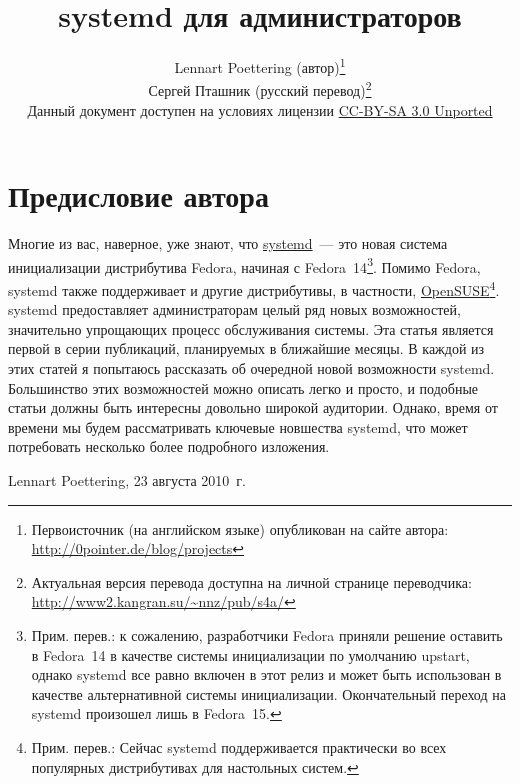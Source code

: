 \documentclass[10pt,oneside,a4paper]{article}
\newcommand{\sectiona}[1]{\section*{#1}\addcontentsline{toc}{section}{#1}}
\begin{document}
\sloppy
\title{systemd для администраторов}
\author{Lennart Poettering (автор)\thanks{Первоисточник (на английском
языке) опубликован на сайте автора: \url{http://0pointer.de/blog/projects}}\\%
Сергей Пташник (русский перевод)\thanks{Актуальная версия перевода
доступна на личной странице переводчика:
\url{http://www2.kangran.su/~nnz/pub/s4a/}}\\%
\small Данный документ доступен на условиях лицензии
\href{http://creativecommons.org/licenses/by-sa/3.0/legalcode}{CC-BY-SA 3.0
Unported}}
\maketitle
\tableofcontents
\newpage
\sectiona{Предисловие автора}
Многие из вас, наверное, уже знают, что
\href{http://www.freedesktop.org/wiki/Software/systemd}{systemd}~--- это новая
система инициализации дистрибутива Fedora, начиная с Fedora~14\footnote{Прим.
перев.: к сожалению, разработчики Fedora приняли решение оставить в Fedora~14 в
качестве системы инициализации по умолчанию upstart, однако systemd все равно
включен в этот релиз и может быть использован в качестве альтернативной системы
инициализации. Окончательный переход на systemd произошел лишь в Fedora~15.}.
Помимо Fedora, systemd также поддерживает и другие дистрибутивы, в частности,
\href{http://en.opensuse.org/SDB:Systemd}{OpenSUSE}\footnote{Прим. перев.:
Сейчас systemd поддерживается практически во всех популярных дистрибутивах для
настольных систем.}.  systemd предоставляет администраторам целый ряд новых
возможностей, значительно упрощающих процесс обслуживания системы. Эта статья
является первой в серии публикаций, планируемых в ближайшие месяцы. В каждой из
этих статей я попытаюсь рассказать об очередной новой возможности systemd.
Большинство этих возможностей можно описать легко и просто, и подобные статьи
должны быть интересны довольно широкой аудитории.  Однако, время от времени мы
будем рассматривать ключевые новшества systemd, что может потребовать несколько
более подробного изложения.
\begin{flushright}
	Lennart Poettering, 23 августа 2010~г.
\end{flushright}
\end{document}
